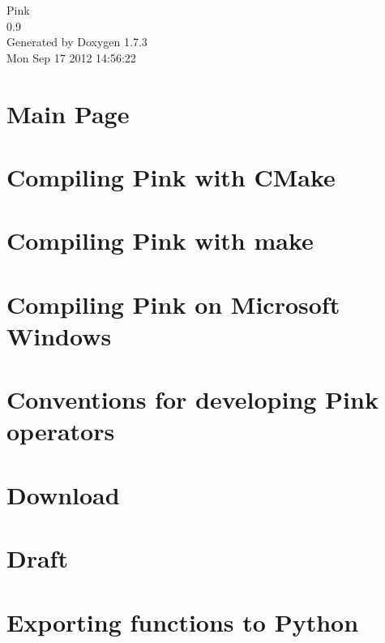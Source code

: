 \documentclass[a4paper]{book}
\begin{document}
\begin{titlepage}
\vspace*{7cm}
\begin{center}
{\Large Pink \\[1ex]\large 0.9 }\\
\vspace*{1cm}
{\large Generated by Doxygen 1.7.3}\\
\vspace*{0.5cm}
{\small Mon Sep 17 2012 14:56:22}\\
\end{center}
\end{titlepage}
\clearemptydoublepage
{}
\tableofcontents
\clearemptydoublepage
{}
\chapter{Main Page}
\label{index}
\chapter{Compiling Pink with CMake}
\label{compiling_cmake}

\chapter{Compiling Pink with make}
\label{compiling_make}

\chapter{Compiling Pink on Microsoft Windows}
\label{compiling_windows}

\chapter{Conventions for developing Pink operators}
\label{dev_conventions}

\chapter{Download}
\label{download}

\chapter{Draft}
\label{files_to_copy}

\chapter{Exporting functions to Python}
\label{python_export}

\end{document}
